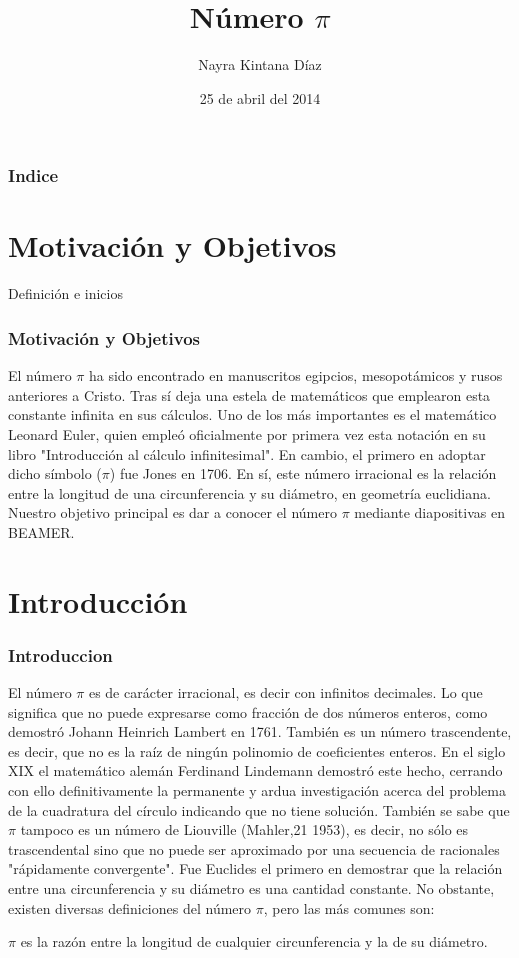 \documentclass{beamer}
\title[El número $\pi$]{Número $\pi$}
\author[alu0100757507]{Nayra Kintana Díaz}
\institute{Facultad Matemáticas}
\date[25/04/2014]{25 de abril del 2014}
\begin{document}
\begin{frame}
\titlepage
\end{frame}

\begin{frame}
\frametitle{Indice}
\tableofcontents
\end{frame}

\section{Motivación y Objetivos}
\begin{frame}
\begin{block}{Definición e inicios}
\frametitle{Motivación y Objetivos}
El número $\pi$ ha sido encontrado en manuscritos egipcios, mesopotámicos y rusos anteriores a Cristo. Tras sí deja una estela de matemáticos que emplearon esta constante infinita en sus cálculos. Uno de los más importantes es el matemático Leonard Euler, quien empleó oficialmente por primera vez esta notación en su libro "Introducción al cálculo infinitesimal". En cambio, el primero en adoptar dicho símbolo ($\pi$) fue Jones en 1706.
%
En sí, este número irracional es la relación entre la longitud de una circunferencia y su diámetro, en geometría euclidiana.
%
Nuestro objetivo principal es dar a conocer el número $\pi$ mediante diapositivas en BEAMER.
\end{block}
\end{frame}
%
\section{Introducción}
\begin{frame}
\frametitle{Introduccion}

El número $\pi$ es de carácter irracional, es decir con infinitos decimales. Lo que significa que no puede expresarse como fracción de dos números enteros, como demostró Johann Heinrich Lambert en 1761. También es un número trascendente, es decir, que no es la raíz de ningún polinomio de coeficientes enteros. En el siglo XIX el matemático alemán Ferdinand Lindemann demostró este hecho, cerrando con ello definitivamente la permanente y ardua investigación acerca del problema de la cuadratura del círculo indicando que no tiene solución.
También se sabe que $\pi$ tampoco es un número de Liouville (Mahler,21 1953), es decir, no sólo es trascendental sino que no puede ser aproximado por una secuencia de racionales "rápidamente convergente".
%
Fue Euclides el primero en demostrar que la relación entre una circunferencia y su diámetro es una cantidad constante. No obstante, existen diversas definiciones del número $\pi$, pero las más comunes son:

$\pi$ es la razón entre la longitud de cualquier circunferencia y la de su diámetro. 
\end{frame}
\end{document}
